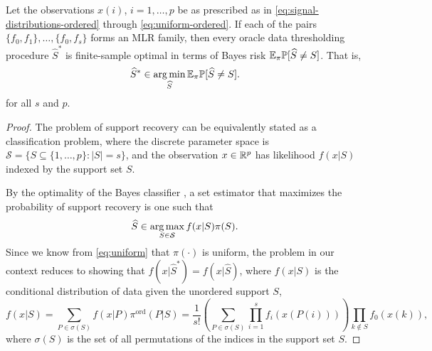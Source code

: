 \begin{proposition} \label{prop:optimal-oracle-procedures}
Let the observations $x(i)$, $i=1,\ldots,p$ be as prescribed as in \eqref{eq:signal-distributions-ordered} through \eqref{eq:uniform-ordered}.
If each of the pairs $\{f_0, f_{1}\},\ldots,\{f_0,f_{s}\}$ forms an MLR family, then every oracle data thresholding procedure $\widehat{S}^*$ is finite-sample optimal in terms of Bayes risk ${\mathbb E}_\pi {\mathbb P}[\widehat{S} \neq S]$. That is,
\begin{equation} \label{eq:finite-sample-Bayes-optimal}
    \widehat{S}^* \in \operatorname*{arg\,min}_{\widehat{S}} {\mathbb E}_\pi {\mathbb P}[\widehat{S} \neq S].
\end{equation}
for all $s$ and $p$.
\end{proposition} 
\begin{proof}%
The problem of support recovery can be equivalently stated as a classification problem, where the discrete parameter space is $\mathcal{S} = \{S\subseteq\{1,\ldots,p\}:|S|=s\}$, and the observation $x \in\mathbb R^p$ has likelihood $f(x|S)$ indexed by the support set $S$.

By the optimality of the Bayes classifier \citep[see, e.g.,][]{domingos1997optimality}, a set estimator that maximizes the probability of support recovery is one such that
$$
\widehat{S} \in \operatorname*{arg\,max}_{S\in \mathcal{S}} f(x|S) \pi(S).
$$
Since we know from \eqref{eq:uniform} that $\pi(\cdot)$ is uniform, the problem in our context reduces to showing that $f(x|\widehat{S}^*) = f(x|\widehat{S})$, where $f(x|S)$ is the conditional distribution of data given the unordered support $S$,
$$
f(x|S) 
= \sum_{P\in\sigma(S)} f(x|P) \pi^{\text{ord}}(P|S) 
= \frac{1}{s!} \left(\sum_{P\in\sigma{(S)}} \prod_{i=1}^s {f_{i}(x(P(i)))}\right) \prod_{k\not\in S}{f_0(x(k))},
$$
where $\sigma(S)$ is the set of all permutations of the indices in the support set $S$.


\end{proof}
